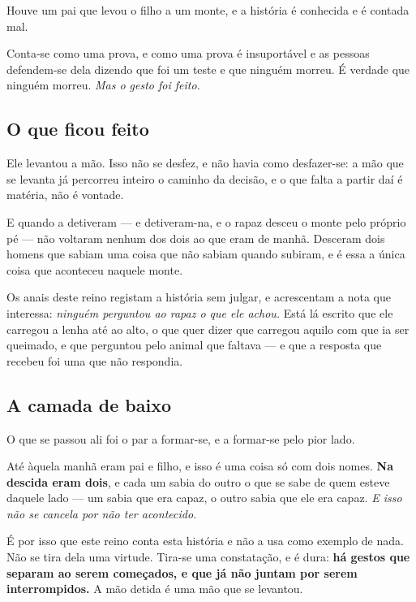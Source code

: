 \documentclass[livro.tex]{subfiles}
\begin{document}
Houve um pai que levou o filho a um monte, e a história é conhecida e é contada mal.

\medskip

Conta-se como uma prova, e como uma prova é insuportável e as pessoas defendem-se dela dizendo que
foi um teste e que ninguém morreu. É verdade que ninguém morreu. \emph{Mas o gesto foi feito.}

\subsection*{O que ficou feito}

Ele levantou a mão. Isso não se desfez, e não havia como desfazer-se: a mão que se levanta já
percorreu inteiro o caminho da decisão, e o que falta a partir daí é matéria, não é vontade.

\medskip

E quando a detiveram --- e detiveram-na, e o rapaz desceu o monte pelo próprio pé --- não voltaram
nenhum dos dois ao que eram de manhã. Desceram dois homens que sabiam uma coisa que não sabiam
quando subiram, e é essa a única coisa que aconteceu naquele monte.

\medskip

Os anais deste reino registam a história sem julgar, e acrescentam a nota que interessa:
\emph{ninguém perguntou ao rapaz o que ele achou.} Está lá escrito que ele carregou a lenha até ao
alto, o que quer dizer que carregou aquilo com que ia ser queimado, e que perguntou pelo animal
que faltava --- e que a resposta que recebeu foi uma que não respondia.

\subsection*{A camada de baixo}

O que se passou ali foi o par a formar-se, e a formar-se pelo pior lado.

\medskip

Até àquela manhã eram pai e filho, e isso é uma coisa só com dois nomes. \textbf{Na descida eram
dois}, e cada um sabia do outro o que se sabe de quem esteve daquele lado --- um sabia que era
capaz, o outro sabia que ele era capaz. \emph{E isso não se cancela por não ter acontecido.}

\medskip

É por isso que este reino conta esta história e não a usa como exemplo de nada. Não se tira dela
uma virtude. Tira-se uma constatação, e é dura: \textbf{há gestos que separam ao serem começados,
e que já não juntam por serem interrompidos.} A mão detida é uma mão que se levantou.
\end{document}

